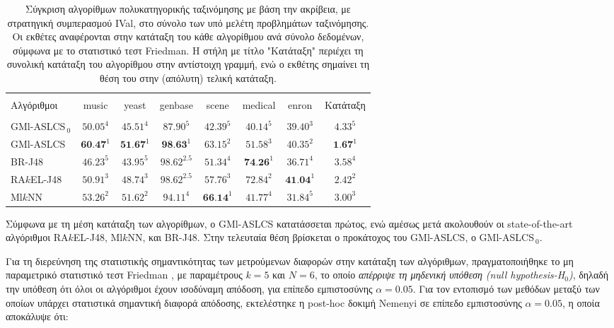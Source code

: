 \begin{table}[!h]
\begin{center}
    \caption[Σύγκριση αλγορίθμων πολυκατηγορικής ταξινόμησης με βάση την ακρίβεια, με μέθοδο ταξινόμησης IVal, στο σύνολο των υπό μελέτη προβλημάτων ταξινόμησης.] {Σύγκριση αλγορίθμων πολυκατηγορικής ταξινόμησης με βάση την ακρίβεια, με στρατηγική συμπερασμού IVal, στο σύνολο των υπό μελέτη προβλημάτων ταξινόμησης. Οι εκθέτες αναφέρονται στην κατάταξη του κάθε αλγορίθμου ανά σύνολο δεδομένων, σύμφωνα με το στατιστικό τεστ Friedman. Η στήλη με τίτλο "Κατάταξη" περιέχει τη συνολική κατάταξη του αλγορίθμου στην αντίστοιχη γραμμή, ενώ ο εκθέτης σημαίνει τη θέση του στην (απόλυτη) τελική κατάταξη.}
	\label{table:accuracyBasedComparison}
    \begin{tabular}{l|cccccc|c}
    \hline \\ [-2ex] 
    Αλγόριθμοι        & music     & yeast     & genbase       & scene     & medical   & enron     & Κατάταξη \\
    \hline \\ [-2ex] 
    GMl-ASLCS$_{\:0}$ & $50.05^4$ & $45.51^4$ & $87.90^5$     & $42.39^5$ & $40.14^5$ & $39.40^3$ & $4.33^5$      \\
    GMl-ASLCS         & $\textbf{60.47}^1$ & $\textbf{51.67}^1$ & $\textbf{98.63}^1$  & $63.15^2$ & $51.58^3$ & $40.35^2$ & $\textbf{1.67}^1$  \\
    BR-J48            & $46.23^5$ & $43.95^5$ & $98.62^{2.5}$ & $51.34^4$ & $\textbf{74.26}^1$ & $36.71^4$ & $3.58^4$    \\
    RA$k$EL-J48       & $50.91^3$ & $48.74^3$ & $98.62^{2.5}$ & $57.76^3$ & $72.84^2$ & $\textbf{41.04}^1$ & $2.42^2$      \\
    Ml$k$NN           & $53.26^2$ & $51.62^2$ & $94.11^4$     & $\textbf{66.14}^1$ & $41.77^4$ & $31.84^5$ & $3.00^3$        
    \\ \hline
    \end{tabular}
\end{center}
\end{table}


Σύμφωνα με τη μέση κατάταξη των αλγορίθμων, ο GMl-ASLCS κατατάσσεται πρώτος, ενώ αμέσως μετά ακολουθούν οι state-of-the-art αλγόριθμοι RA$k$EL-J48, Ml$k$NN, και BR-J48. Στην τελευταία θέση βρίσκεται ο προκάτοχος του GMl-ASLCS, ο GMl-ASLCS$_{\:0}$.

Για τη διερεύνηση της στατιστικής σημαντικότητας των μετρούμενων διαφορών στην κατάταξη των αλγόριθμων, πραγματοποιήθηκε το μη παραμετρικό στατιστικό τεστ Friedman \cite{Friedman1940}, με παραμέτρους $k=5$ και $N=6$, το οποίο \emph{απέρριψε τη μηδενική υπόθεση (null hypothesis-H$_{0}$)}, δηλαδή την υπόθεση ότι όλοι οι αλγόριθμοι έχουν ισοδύναμη απόδοση, για επίπεδο εμπιστοσύνης $\alpha = 0.05$. Για τον εντοπισμό των μεθόδων μεταξύ των οποίων υπάρχει στατιστικά σημαντική διαφορά απόδοσης, εκτελέστηκε η post-hoc δοκιμή Nemenyi \cite{nemenyi63} σε επίπεδο εμπιστοσύνης $\alpha=0.05$, η οποία αποκάλυψε ότι:

